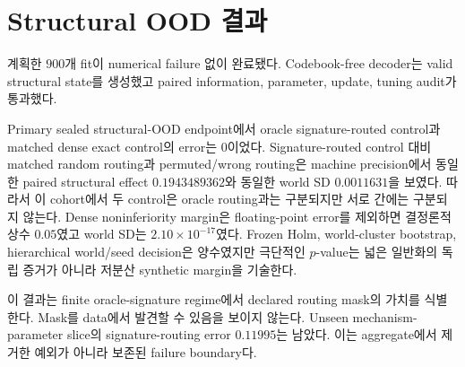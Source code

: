 \section{Structural OOD 결과}
\label{sec:ood-results}

계획한 \(900\)개 fit이 numerical failure 없이 완료됐다. Codebook-free
decoder는 valid structural state를 생성했고 paired information, parameter,
update, tuning audit가 통과했다.

Primary sealed structural-OOD endpoint에서 oracle signature-routed control과
matched dense exact control의 error는 0이었다. Signature-routed control 대비
matched random routing과 permuted/wrong routing은 machine precision에서 동일한
paired structural effect \(0.1943489362\)와 동일한 world SD \(0.0011631\)을
보였다. 따라서 이 cohort에서 두 control은 oracle routing과는 구분되지만 서로
간에는 구분되지 않는다. Dense noninferiority margin은 floating-point error를
제외하면 결정론적 상수 \(0.05\)였고 world SD는 \(2.10\times10^{-17}\)였다.
Frozen Holm, world-cluster bootstrap, hierarchical world/seed decision은
양수였지만 극단적인 \(p\)-value는 넓은 일반화의 독립 증거가 아니라 저분산
synthetic margin을 기술한다.

이 결과는 finite oracle-signature regime에서 declared routing mask의 가치를
식별한다. Mask를 data에서 발견할 수 있음을 보이지 않는다. Unseen
mechanism-parameter slice의 signature-routing error \(0.11995\)는 남았다.
이는 aggregate에서 제거한 예외가 아니라 보존된 failure boundary다.

